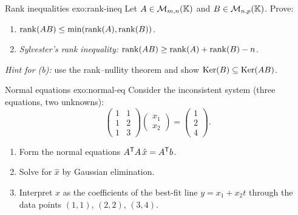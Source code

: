 \begin{exercise}{Rank inequalities \challenging}{exo:rank-ineq}
Let $A\in\mathcal{M}_{m,n}({\mathbb{K}})$ and $B\in\mathcal{M}_{n,p}({\mathbb{K}})$. Prove:
\begin{enumerate}[label=(\alph*)]
  \item $\operatorname{rank}(AB) \leq \min(\operatorname{rank}(A), \operatorname{rank}(B))$.
  \item \emph{Sylvester's rank inequality:}
    $\operatorname{rank}(AB) \geq \operatorname{rank}(A) + \operatorname{rank}(B) - n$.
\end{enumerate}
\textit{Hint for (b):} use the rank--nullity theorem and show
$\operatorname{Ker}(B) \subseteq \operatorname{Ker}(AB)$.
\end{exercise}

\begin{exercise}{Normal equations \challenging}{exo:normal-eq}
Consider the inconsistent system (three equations, two unknowns):
\[
  \begin{pmatrix} 1 & 1\\ 1 & 2\\ 1 & 3 \end{pmatrix}
  \begin{pmatrix} x_1\\ x_2 \end{pmatrix}
  = \begin{pmatrix} 1\\ 2\\ 4 \end{pmatrix}.
\]
\begin{enumerate}[label=(\alph*)]
  \item Form the normal equations ${A}^{\mathsf{T}}A\,\hat{x} =
    {A}^{\mathsf{T}}b$.
  \item Solve for $\hat{x}$ by Gaussian elimination.
  \item Interpret $\hat{x}$ as the coefficients of the best-fit
    line $y = x_1 + x_2 t$ through the data points
    $(1,1)$, $(2,2)$, $(3,4)$.
\end{enumerate}
\end{exercise}

